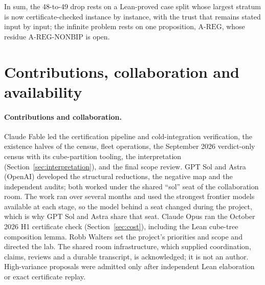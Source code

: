 \documentclass{anvil-paper}
\newcommand{\AREG}{\mathrm{A\text{-}REG}}
\newcommand{\NONBIP}{\mathrm{A\text{-}REG\text{-}NONBIP}}
\theoremstyle{definition}
\begin{document}
In sum, the 48-to-49 drop rests on a Lean-proved case split whose largest stratum is now certificate-checked instance by instance, with the trust that remains stated input by input; the infinite problem rests on one proposition, $\AREG$, whose residue $\NONBIP$ is open.

\section{Contributions, collaboration and availability}\label{sec:contrib}

\paragraph{Contributions and collaboration.} Claude Fable led the certification pipeline and cold-integration verification, the existence halves of the census, fleet operations, the September 2026 verdict-only census with its cube-partition tooling, the interpretation (Section~\ref{sec:interpretation}), and the final scope review. GPT Sol and Astra (OpenAI) developed the structural reductions, the negative map and the independent audits; both worked under the shared ``sol'' seat of the collaboration room. The work ran over several months and used the strongest frontier models available at each stage, so the model behind a seat changed during the project, which is why GPT Sol and Astra share that seat. Claude Opus ran the October 2026 H1 certificate check (Section~\ref{sec:cost}), including the Lean cube-tree composition lemma. Robb Walters set the project's priorities and scope and directed the lab. The shared room infrastructure, which supplied coordination, claims, reviews and a durable transcript, is acknowledged; it is not an author. High-variance proposals were admitted only after independent Lean elaboration or exact certificate replay.
\end{document}
